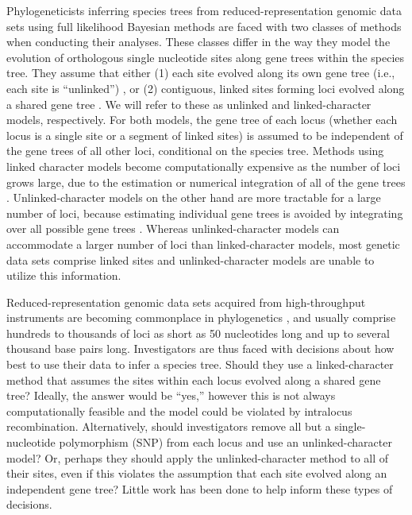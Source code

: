 Phylogeneticists inferring species trees from reduced-representation genomic 
data sets using full likelihood Bayesian methods are faced with two 
classes of methods when conducting their analyses.
These classes differ in the way they model the evolution of orthologous single nucleotide 
sites along gene trees within the species 
tree. They assume that either (1) each site evolved along its own gene tree 
(i.e., each site is ``unlinked'') 
\citep{bryantInferringSpeciesTrees2012, maioPoMoAlleleFrequencyBased2015}, 
or (2) contiguous, linked sites forming loci evolved along a shared gene tree 
\citep{liuSpeciesTreesGene2007, Heled2010, ogilvieStarBEAST2BringsFaster2017, 
yangBPPProgramSpecies2015}. We will refer to these as unlinked and 
linked-character models, respectively. For both models, the gene tree of each 
locus (whether each locus is a single site or a segment of linked sites) 
is assumed to be independent of the gene 
trees of all other loci, conditional on the species tree.
Methods using linked character models become computationally expensive as the
number of loci grows large, due to the estimation or numerical integration of
all of the gene trees \citep{bryantInferringSpeciesTrees2012}.
Unlinked-character models on the other 
hand are more tractable for a large number of loci, because  estimating 
individual gene trees is avoided by integrating over all possible gene trees 
\citep{bryantInferringSpeciesTrees2012}.
Whereas unlinked-character models can accommodate a larger number of loci than
linked-character models, most genetic data sets comprise linked sites and
unlinked-character models are unable to utilize this information.

Reduced-representation genomic data sets acquired from high-throughput
instruments are becoming commonplace in phylogenetics \citep{Leache2017}, and
usually comprise hundreds to thousands of loci as short as 50 nucleotides long
and up to several thousand base pairs long.
Investigators are thus faced with decisions about how best to 
use their data to infer a species tree.
Should they use a linked-character method that assumes the sites within each
locus evolved along a shared gene tree?
Ideally, the answer would be ``yes,'' however this is not always
computationally feasible and the model could be violated by intralocus
recombination.
Alternatively, should investigators remove all but a single-nucleotide
polymorphism (SNP) from each locus and use an unlinked-character model?
Or, perhaps they should apply the unlinked-character method to all of their
sites, even if this violates the assumption that each site evolved along an
independent gene tree?
Little work has been done to help inform these types of decisions. 

